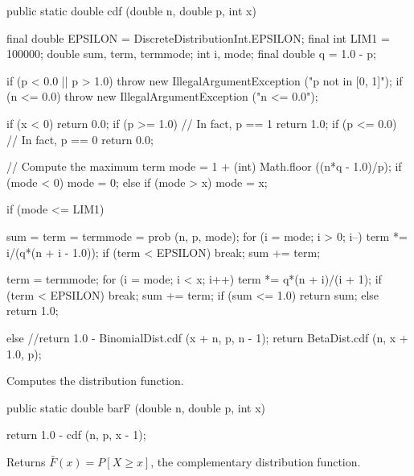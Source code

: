 \begin{code}

   public static double cdf (double n, double p, int x)\begin{hide} {
      final double EPSILON = DiscreteDistributionInt.EPSILON;
      final int LIM1 = 100000;
      double sum, term, termmode;
      int i, mode;
      final double q = 1.0 - p;

      if (p < 0.0 || p > 1.0)
        throw new IllegalArgumentException ("p not in [0, 1]");
      if (n <= 0.0)
        throw new IllegalArgumentException ("n <= 0.0");

      if (x < 0)
         return 0.0;
      if (p >= 1.0)                  // In fact, p == 1
         return 1.0;
      if (p <= 0.0)                  // In fact, p == 0
         return 0.0;

      // Compute the maximum term
      mode = 1 + (int) Math.floor ((n*q - 1.0)/p);
      if (mode < 0)
          mode = 0;
      else if (mode > x)
         mode = x;

      if (mode <= LIM1) {
         sum = term = termmode = prob (n, p, mode);
         for (i = mode; i > 0; i--) {
            term *= i/(q*(n + i - 1.0));
            if (term < EPSILON)
               break;
            sum += term;
         }

         term = termmode;
         for (i = mode; i < x; i++) {
            term *= q*(n + i)/(i + 1);
            if (term < EPSILON)
               break;
            sum += term;
         }
         if (sum <= 1.0)
            return sum;
         else
            return 1.0;
      }
      else
         //return 1.0 - BinomialDist.cdf (x + n, p, n - 1);
         return BetaDist.cdf (n, x + 1.0, p);
    }\end{hide}
\end{code}
  \begin{tabb} Computes the distribution function.
 \end{tabb}
\begin{code}

   public static double barF (double n, double p, int x)\begin{hide} {
      return 1.0 - cdf (n, p, x - 1);
   }\end{hide}
\end{code}
\begin{tabb}  Returns $\bar F(x) = P[X \ge x]$, the complementary
   distribution function.
\end{tabb}
